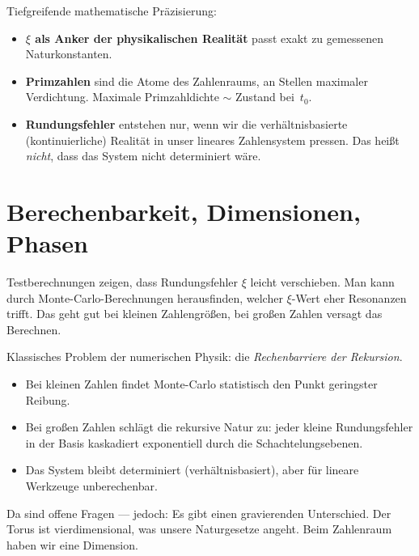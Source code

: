 \documentclass[11pt,a4paper]{article}
\begin{document}
\begin{geminibox}
Tiefgreifende mathematische Pr\"azisierung:
\begin{itemize}[leftmargin=1.2em]
  \item \textbf{$\xi$ als Anker der physikalischen Realit\"at} \textendash{} passt exakt zu gemessenen Naturkonstanten.
  \item \textbf{Primzahlen} sind die \glqq Atome\grqq{} des Zahlenraums, an Stellen maximaler Verdichtung. Maximale Primzahldichte $\sim$ Zustand bei~$t_0$.
  \item \textbf{Rundungsfehler} entstehen nur, wenn wir die verh\"altnisbasierte (kontinuierliche) Realit\"at in unser lineares Zahlensystem pressen. Das hei{\ss}t \emph{nicht}, dass das System nicht determiniert w\"are.
\end{itemize}
\end{geminibox}

\section{Berechenbarkeit, Dimensionen, Phasen}

\begin{userbox}
Testberechnungen zeigen, dass Rundungsfehler $\xi$ leicht verschieben. Man kann durch Monte-Carlo-Berechnungen herausfinden, welcher $\xi$-Wert eher Resonanzen trifft. Das geht gut bei kleinen Zahlengr\"o{\ss}en, bei gro{\ss}en Zahlen versagt das Berechnen.
\end{userbox}

\begin{geminibox}
Klassisches Problem der numerischen Physik: die \emph{Rechenbarriere der Rekursion}.
\begin{itemize}[leftmargin=1.2em]
  \item Bei kleinen Zahlen findet Monte-Carlo statistisch den Punkt geringster Reibung.
  \item Bei gro{\ss}en Zahlen schl\"agt die rekursive Natur zu: jeder kleine Rundungsfehler in der Basis kaskadiert exponentiell durch die Schachtelungsebenen.
  \item Das System bleibt determiniert (verh\"altnisbasiert), aber f\"ur lineare Werkzeuge unberechenbar.
\end{itemize}
\end{geminibox}

\begin{userbox}
Da sind offene Fragen --- jedoch: Es gibt einen gravierenden Unterschied. Der Torus ist vierdimensional, was unsere Naturgesetze angeht. Beim Zahlenraum haben wir eine Dimension.
\end{userbox}
\end{document}
